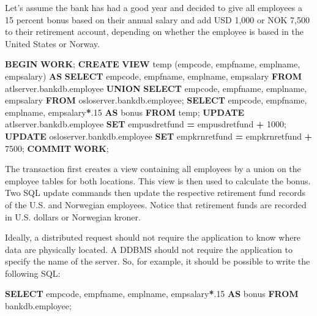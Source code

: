 \documentclass[
]{article}
\newenvironment{Shaded}{\begin{snugshade}}{\end{snugshade}}
\newcommand{\ControlFlowTok}[1]{\textcolor[rgb]{0.13,0.29,0.53}{\textbf{#1}}}
\newcommand{\DecValTok}[1]{\textcolor[rgb]{0.00,0.00,0.81}{#1}}
\newcommand{\KeywordTok}[1]{\textcolor[rgb]{0.13,0.29,0.53}{\textbf{#1}}}
\newcommand{\NormalTok}[1]{#1}
\newcommand{\OperatorTok}[1]{\textcolor[rgb]{0.81,0.36,0.00}{\textbf{#1}}}
\begin{document}
Let's assume the bank has had a good year and decided to give all
employees a 15 percent bonus based on their annual salary and add USD
1,000 or NOK 7,500 to their retirement account, depending on whether the
employee is based in the United States or Norway.

\begin{Shaded}
\begin{Highlighting}[]
\ControlFlowTok{BEGIN} \KeywordTok{WORK}\NormalTok{;}
\KeywordTok{CREATE} \KeywordTok{VIEW}\NormalTok{ temp }
\NormalTok{    (empcode, empfname, emplname, empsalary)}
\KeywordTok{AS} 
    \KeywordTok{SELECT}\NormalTok{ empcode, empfname, emplname, empsalary}
        \KeywordTok{FROM}\NormalTok{ atlserver.bankdb.employee}
    \KeywordTok{UNION}
    \KeywordTok{SELECT}\NormalTok{ empcode, empfname, emplname, empsalary}
        \KeywordTok{FROM}\NormalTok{ osloserver.bankdb.employee;}
\KeywordTok{SELECT}\NormalTok{ empcode, empfname, emplname, empsalary}\OperatorTok{*}\NormalTok{.}\DecValTok{15} \KeywordTok{AS}\NormalTok{ bonus}
        \KeywordTok{FROM}\NormalTok{ temp;}
\KeywordTok{UPDATE}\NormalTok{ atlserver.bankdb.employee}
    \KeywordTok{SET}\NormalTok{ empusdretfund }\OperatorTok{=}\NormalTok{ empusdretfund }\OperatorTok{+} \DecValTok{1000}\NormalTok{;}
\KeywordTok{UPDATE}\NormalTok{ osloserver.bankdb.employee}
    \KeywordTok{SET}\NormalTok{ empkrnretfund }\OperatorTok{=}\NormalTok{ empkrnretfund }\OperatorTok{+} \DecValTok{7500}\NormalTok{;}
\KeywordTok{COMMIT} \KeywordTok{WORK}\NormalTok{;}
\end{Highlighting}
\end{Shaded}

The transaction first creates a view containing all employees by a union
on the employee tables for both locations. This view is then used to
calculate the bonus. Two SQL update commands then update the respective
retirement fund records of the U.S. and Norwegian employees. Notice that
retirement funds are recorded in U.S. dollars or Norwegian kroner.

Ideally, a distributed request should not require the application to
know where data are physically located. A DDBMS should not require the
application to specify the name of the server. So, for example, it
should be possible to write the following SQL:

\begin{Shaded}
\begin{Highlighting}[]
\KeywordTok{SELECT}\NormalTok{ empcode, empfname, emplname, empsalary}\OperatorTok{*}\NormalTok{.}\DecValTok{15} \KeywordTok{AS}\NormalTok{ bonus}
        \KeywordTok{FROM}\NormalTok{ bankdb.employee;}
\end{Highlighting}
\end{Shaded}
\end{document}

